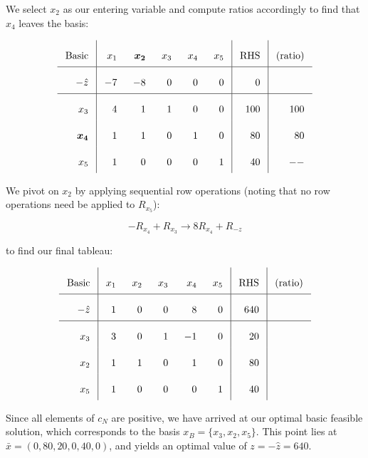\begin{solution}
  We select $x_2$ as our entering variable and compute ratios accordingly to find that $x_4$ leaves the basis:

  \[\arraycolsep=8pt\def\arraystretch{2.2}
  \begin{array}{r|rrrrr|r|r}
    \text{Basic} &  x_1  &  \bm{x_2}  &  x_3  &  x_4  & x_5 & \text{RHS} & \text{(ratio)}  \\ \hline
    -\hat{z}     &  -7   &  -8        &   0   &   0   &  0  &    0       &                 \\ \hline
    x_3          &   4   &   1        &   1   &   0   &  0  &  100       & 100             \\
    \bm{x_4}     &   1   &   1        &   0   &   1   &  0  &   80       & 80              \\
    x_5          &   1   &   0        &   0   &   0   &  1  &   40       & --             
  \end{array}
  \]

  \pagebreak
  We pivot on $x_2$ by applying sequential row operations (noting that no row operations need be applied to $R_{x_5}$):

  $$
    -R_{x_4} + R_{x_3} \longrightarrow
   8 R_{x_4} + R_{-z} 
  $$

  to find our final tableau:

  \[\arraycolsep=8pt\def\arraystretch{2.2}
  \begin{array}{r|rrrrr|r|r}
    \text{Basic} &  x_1  &  x_2  &  x_3  &  x_4  & x_5 & \text{RHS} & \text{(ratio)}  \\ \hline
    -\hat{z}     &  1    &  0    &   0   &   8   &  0  &  640       &                 \\ \hline
    x_3          &  3    &  0    &   1   &  -1   &  0  &   20       &                 \\
    x_2          &  1    &  1    &   0   &   1   &  0  &   80       &                 \\
    x_5          &  1    &  0    &   0   &   0   &  1  &   40       &                
  \end{array}
  \]

  Since all elements of $c_N$ are positive, we have arrived at our optimal basic feasible solution, which corresponds to
  the basis $x_B = \{x_3, x_2, x_5\}$. This point lies at \linebreak
  $\bar{x} = \left(0, 80, 20, 0, 40, 0\right)$, and yields an optimal value of $z = -\hat{z} = 640$.
  \ \\
\end{solution}